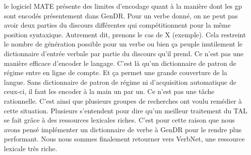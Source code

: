 le logiciel MATE présente des limites d'encodage quant à la manière dont les gp sont encodés présentement dans GenDR. Pour un verbe donné, on ne peut pas avoir deux parties du discours différentes qui compétitionnent pour la même position syntaxique. Autrement dit, prenons le cas de X (exemple). Cela restreint le nombre de génération possible pour un verbe ou bien ça peuple inutilement le dictionnaire d'entrée verbale par partie du discours qu'il prend. Ce n'est pas une manière efficace d'encoder le langage. C'est là qu'un dictionnaire de patron de régime entre en ligne de compte. Et ça permet une grande couverture de la langue. Sans dictionnaire de patron de régime ni d'acquisition automatique de ceux-ci, il faut les encoder à la main un par un. Ce n'est pas une tâche rationnelle. C'est ainsi que plusieurs groupes de recherches ont voulu remédier à cette situation. Plusieurs s'entendent pour dire qu'un meilleur traitement du \ac{TAL} se fait grâce à des ressources lexicales riches. C'est pour cette raison que nous avons pensé implémenter un dictionnaire de verbe à GenDR pour le rendre plus performant. Nous nous sommes finalement retourner vers VerbNet, une ressource lexicale très riche.
